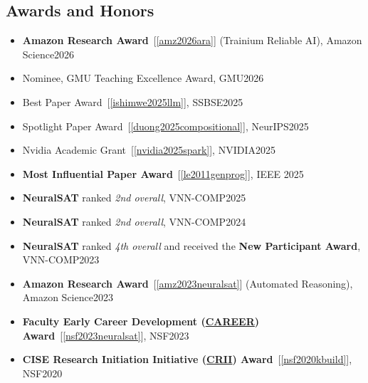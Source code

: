 \documentclass[11pt]{article}
\begin{document}
\subsection{Awards and Honors}

\begin{itemize}
    \item \textbf{Amazon Research Award}~[\ref{amz2026ara}] (Trainium Reliable AI), Amazon Science\hfill 2026    
    \item Nominee, GMU Teaching Excellence Award, GMU\hfill 2026
    \item Best Paper Award~[\ref{ishimwe2025llm}], SSBSE\hfill 2025        
    \item Spotlight Paper Award~[\ref{duong2025compositional}], NeurIPS\hfill 2025
    \item Nvidia Academic Grant~[\ref{nvidia2025spark}], NVIDIA\hfill 2025    
    \item \textbf{Most Influential Paper Award}~[\ref{le2011genprog}], IEEE \hfill 2025
    \item \textbf{NeuralSAT} ranked \emph{2nd overall}, VNN-COMP\hfill 2025
    \item \textbf{NeuralSAT} ranked \emph{2nd overall}, VNN-COMP\hfill 2024
    \item \textbf{NeuralSAT} ranked \emph{4th overall} and received the \textbf{New Participant Award}, VNN-COMP\hfill 2023
    \item \textbf{Amazon Research Award}~[\ref{amz2023neuralsat}] (Automated Reasoning), Amazon Science\hfill 2023
    \item \textbf{Faculty Early Career Development (\href{https://www.nsf.gov/awardsearch/showAward?AWD_ID=2238133}{CAREER}) Award}~[\ref{nsf2023neuralsat}], NSF\hfill 2023
    
    \item \textbf{CISE Research Initiation Initiative (\href{https://www.nsf.gov/awardsearch/showAward?AWD_ID=1948536}{CRII}) Award}~[\ref{nsf2020kbuild}], NSF\hfill 2020
    

\end{itemize}
\end{document}
